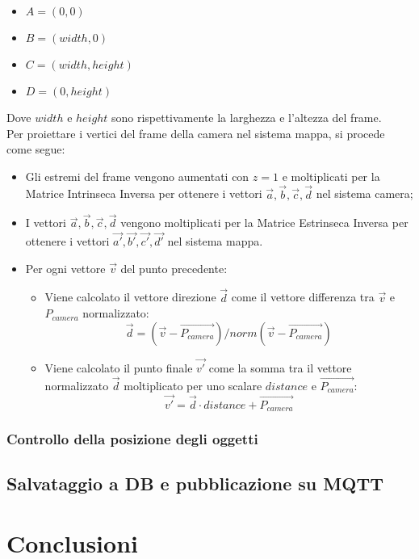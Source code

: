 \begin{itemize}
	\item $A = (0, 0)$
	\item $B = (width, 0)$
	\item $C = (width, height)$
	\item $D = (0, height)$
\end{itemize}
Dove $width$ e $height$ sono rispettivamente la larghezza e l'altezza del frame.\\
Per proiettare i vertici del frame della camera nel sistema mappa, si procede come segue:
\begin{itemize}
	\item Gli estremi del frame vengono aumentati con $z=1$ e moltiplicati per la Matrice Intrinseca Inversa per ottenere i vettori $\vec{a}, \vec{b}, \vec{c}, \vec{d}$ nel sistema camera;
	\item I vettori $\vec{a}, \vec{b}, \vec{c}, \vec{d}$ vengono moltiplicati per la Matrice Estrinseca Inversa per ottenere i vettori $\vec{a'}, \vec{b'}, \vec{c'}, \vec{d'}$ nel sistema mappa.
	\item Per ogni vettore $\vec{v}$ del punto precedente:
	      \begin{itemize}
		      \item Viene calcolato il vettore direzione $\vec{d}$ come il vettore differenza tra $\vec{v}$ e $P_{camera}$ normalizzato: $$\vec{d} = (\vec{v} - \overrightarrow{P_{camera}})/norm(\vec{v} - \overrightarrow{P_{camera}}) $$
		      \item Viene calcolato il punto finale $\vec{v'}$ come la somma tra il vettore normalizzato $\vec{d}$ moltiplicato per uno scalare $distance$ e $\overrightarrow{P_{camera}}$:$$\vec{v'} = \vec{d} \cdot distance + \overrightarrow{P_{camera}}$$
	      \end{itemize}
\end{itemize}


\subsubsection{Controllo della posizione degli oggetti}
\subsection{Salvataggio a DB e pubblicazione su MQTT}



\section{Conclusioni}

